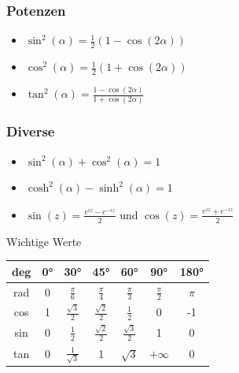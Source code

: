 \documentclass[a4paper,10pt]{article}
\begin{document}
\subsubsection{Potenzen}
\begin{itemize}
 \item $\sin^2(\alpha) = \frac{1}{2}(1-\cos(2\alpha))$
 \item $\cos^2(\alpha) = \frac{1}{2}(1+\cos(2\alpha))$
 \item $\tan^2(\alpha) = \frac{1-\cos(2\alpha)}{1+\cos(2\alpha)}$
\end{itemize}

\subsubsection{Diverse}

\begin{itemize}
 \item $\sin^2(\alpha) + \cos^2(\alpha) = 1$
 \item $\cosh^2(\alpha) - \sinh^2(\alpha) = 1$
 \item $\sin(z) = \frac{e^{iz} - e^{-iz}}{2}$ und $\cos(z) = \frac{e^{iz} + e^{-iz}}{2}$
\end{itemize}

\begingroup
\renewcommand*{\arraystretch}{2}

\begin{mainbox}{Wichtige Werte}
  \begin{center} 
    \begin{tabular}{c|cccccc}
      deg & 0° & 30° & 45° & 60° & 90° & 180° \\
      \midrule
      rad & 0 & $\frac{\pi}{6}$ & $\frac{\pi}{4}$ & $\frac{\pi}{3}$ & $\frac{\pi}{2}$ & $\pi$ \\
      cos & 1 & $\frac{\sqrt{3}}{2}$ & $\frac{\sqrt{2}}{2}$ & $\frac{1}{2}$ & 0 & -1 \\
      sin & 0 & $\frac{1}{2}$ & $\frac{\sqrt{2}}{2}$ & $\frac{\sqrt{3}}{2}$ & 1 & 0 \\
      tan & 0 & $\frac{1}{\sqrt{3}}$ & 1 & $\sqrt{3}$ & $+\infty$ & 0 \\
    \end{tabular}
  \end{center}
\end{mainbox}
\end{document}
